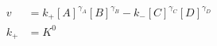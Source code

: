 \begin{eqnarray}
v & = k_+[A]^{\gamma_A}[B]^{\gamma_B} - k_-[C]^{\gamma_C}[D]^{\gamma_D} \\
k_+ &= K^0
\end{eqnarray}
